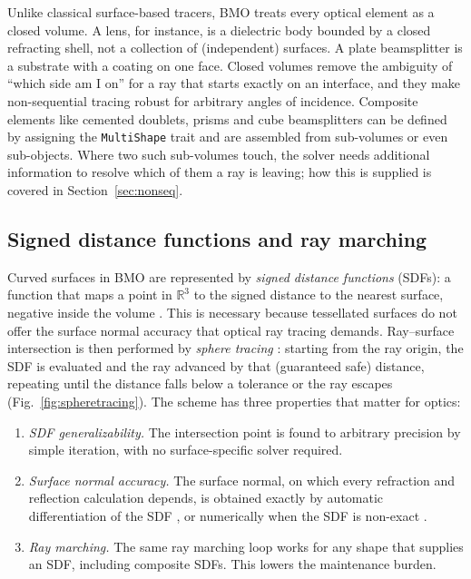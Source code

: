 \documentclass{juliacon}
\begin{document}
Unlike classical surface-based tracers, BMO treats every optical element
as a closed volume. A lens, for instance, is a dielectric body bounded
by a closed refracting shell, not a collection of (independent)
surfaces. A plate beamsplitter is a substrate with a coating on one
face. Closed volumes remove the ambiguity of ``which side am I on'' for
a ray that starts exactly on an interface, and they make non-sequential
tracing robust for arbitrary angles of incidence. Composite elements
like cemented doublets, prisms and cube beamsplitters can be defined by
assigning the \texttt{MultiShape} trait and are assembled from
sub-volumes or even sub-objects. Where two such sub-volumes touch, the
solver needs additional information to resolve which of them a ray is
leaving; how this is supplied is covered in Section~\ref{sec:nonseq}.

\subsection{Signed distance functions and ray marching}

Curved surfaces in BMO are represented by \emph{signed distance
functions} (SDFs): a function that maps a point in $\mathbb{R}^3$ to the
signed distance to the nearest surface, negative inside the volume
\cite{Osher:2003}. This is necessary because tessellated surfaces do not
offer the surface normal accuracy that optical ray tracing demands.
Ray--surface intersection is then performed by \emph{sphere tracing}
\cite{Hart1996}: starting from the ray origin, the SDF is evaluated and
the ray advanced by that (guaranteed safe) distance, repeating until the
distance falls below a tolerance or the ray escapes
(Fig.~\ref{fig:spheretracing}). The scheme has three properties that
matter for optics:
\begin{enumerate}
  \item \emph{SDF generalizability.} The intersection point is found to
arbitrary precision by simple iteration, with no surface-specific solver
required.
  \item \emph{Surface normal accuracy.} The surface normal, on which
every refraction and reflection calculation depends, is obtained exactly
by automatic differentiation of the SDF \cite{Revels2016}, or
numerically when the SDF is non-exact \cite{Quilez_sdf}.
  \item \emph{Ray marching.} The same ray marching loop works for any
shape that supplies an SDF, including composite SDFs. This lowers the
maintenance burden.
\end{enumerate}
\end{document}
